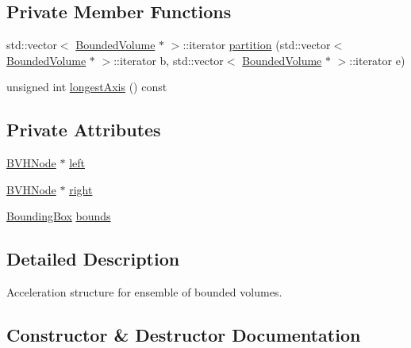 \subsection*{Private Member Functions}
\begin{DoxyCompactItemize}
\item 
std\+::vector$<$ \hyperlink{classBoundedVolume}{Bounded\+Volume} $\ast$ $>$\+::iterator \hyperlink{classBinaryVolumeHierarchy_ab30dec4aa6ef808f53bbdedb98d8af65}{partition} (std\+::vector$<$ \hyperlink{classBoundedVolume}{Bounded\+Volume} $\ast$ $>$\+::iterator b, std\+::vector$<$ \hyperlink{classBoundedVolume}{Bounded\+Volume} $\ast$ $>$\+::iterator e)
\item 
unsigned int \hyperlink{classBinaryVolumeHierarchy_a93e3d7fd0b06a83675e36594d3fcaa8b}{longest\+Axis} () const 
\end{DoxyCompactItemize}
\subsection*{Private Attributes}
\begin{DoxyCompactItemize}
\item 
\hyperlink{structBVHNode}{B\+V\+H\+Node} $\ast$ \hyperlink{classBinaryVolumeHierarchy_a76372fd6f7d6a5783d9b8688fc40d5b4}{left}
\item 
\hyperlink{structBVHNode}{B\+V\+H\+Node} $\ast$ \hyperlink{classBinaryVolumeHierarchy_a3b950d10a084fedfeaa02727d654b782}{right}
\item 
\hyperlink{classBoundingBox}{Bounding\+Box} \hyperlink{classBinaryVolumeHierarchy_a2722a35a0c3c6fee488f186c31869b53}{bounds}
\end{DoxyCompactItemize}


\subsection{Detailed Description}
Acceleration structure for ensemble of bounded volumes. 

\subsection{Constructor \& Destructor Documentation}
